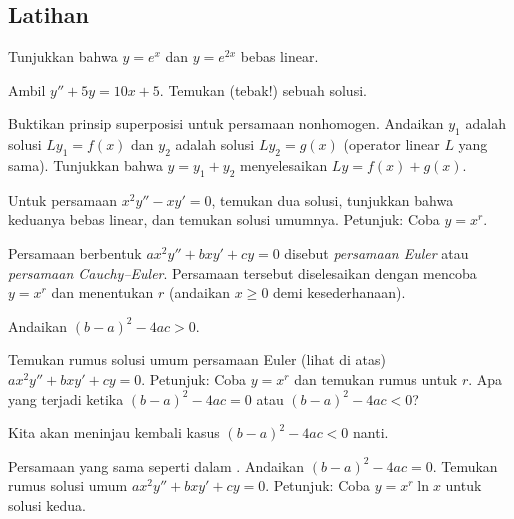 \subsection{Latihan}

\begin{exercise}
Tunjukkan bahwa $y=e^x$ dan $y=e^{2x}$ bebas linear.
\end{exercise}

\begin{exercise}
Ambil $y'' + 5 y = 10 x + 5$. Temukan (tebak!) sebuah solusi.
\end{exercise}

\begin{exercise}
Buktikan prinsip superposisi untuk persamaan nonhomogen. Andaikan $y_1$ adalah solusi $L y_1 = f(x)$ dan $y_2$ adalah solusi $L y_2 = g(x)$ (operator linear $L$ yang sama). Tunjukkan bahwa $y = y_1+y_2$ menyelesaikan $Ly = f(x) + g(x)$.
\end{exercise}

\begin{exercise}
Untuk persamaan $x^2 y'' - x y' = 0$, temukan dua solusi, tunjukkan bahwa keduanya bebas linear, dan temukan solusi umumnya.
Petunjuk: Coba $y = x^r$.
\end{exercise}

\pagebreak[2]
Persamaan berbentuk $a x^2 y'' + b x y' + c y = 0$ disebut
\emph{persamaan Euler} atau
\emph{persamaan Cauchy--Euler}.
Persamaan tersebut diselesaikan dengan mencoba $y=x^r$ dan menentukan $r$ (andaikan $x \geq 0$ demi kesederhanaan).

\begin{exercise} \label{sol:eulerex}
\pagebreak[2]
Andaikan ${(b-a)}^2-4ac > 0$.
\begin{tasks}
\task Temukan rumus solusi umum persamaan Euler (lihat di atas) $a x^2 y'' + b x y' + c y = 0$.
Petunjuk: Coba $y=x^r$ dan temukan rumus untuk $r$.
\task Apa yang terjadi ketika ${(b-a)}^2-4ac = 0$ atau ${(b-a)}^2-4ac < 0$?
\end{tasks}
\end{exercise}

Kita akan meninjau kembali kasus ${(b-a)}^2-4ac < 0$ nanti.

\begin{exercise} \label{sol:eulerexln}
Persamaan yang sama seperti dalam .
Andaikan ${(b-a)}^2-4ac = 0$. Temukan rumus solusi umum $a x^2 y'' + b x y' + c y = 0$. Petunjuk: Coba $y=x^r \ln x$ untuk solusi kedua.
\end{exercise}

